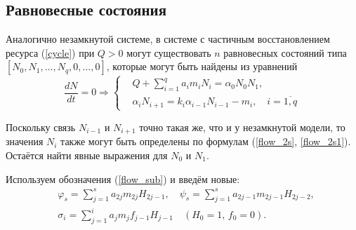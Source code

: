 \subsection{Равновесные состояния}
Аналогично незамкнутой системе, в системе с частичным восстановлением ресурса (\ref{cycle}) при \(Q > 0\) могут существовать \( n \) равновесных состояний типа \(\left[ N_0, N_1, \ldots, N_q, 0, \ldots, 0 \right]\), которые могут быть найдены из уравнений
\begin{equation} \label{cycle_stationary_equations}
    \frac{dN}{dt} = 0 \Rightarrow
    \left\lbrace\begin{split}
        & Q + \sum_{i=1}^{q} a_i m_i N_i = \alpha_0 N_0 N_1, \\
        & \alpha_i N_{i+1} = k_i \alpha_{i-1} N_{i-1} - m_i, \quad i=\overline{1,q}                
    \end{split}\right.
\end{equation}

Поскольку связь \(N_{i-1}\) и \(N_{i+1}\) точно такая же, что и у незамкнутой модели, то значения \(N_i\) также могут быть определены по формулам (\ref{flow_2s}, \ref{flow_2s1}). Остаётся найти явные выражения для \(N_0\) и \( N_1\).

Используем обозначения (\ref{flow_sub}) и введём новые:
\begin{equation} \label{cycle_sub}
    \begin{split}
    & \varphi_s = \sum_{j=1}^{s} a_{2j} m_{2j} H_{2j-1}, \quad 
    \psi_s = \sum_{j=1}^{s} a_{2j-1} m_{2j-1} H_{2j-2}, \\
    & \sigma_i = \sum_{j=1}^{i} a_j m_j f_{j-1} H_{j-1} \quad (H_0 = 1, \, f_0 = 0).
    \end{split}
\end{equation}


